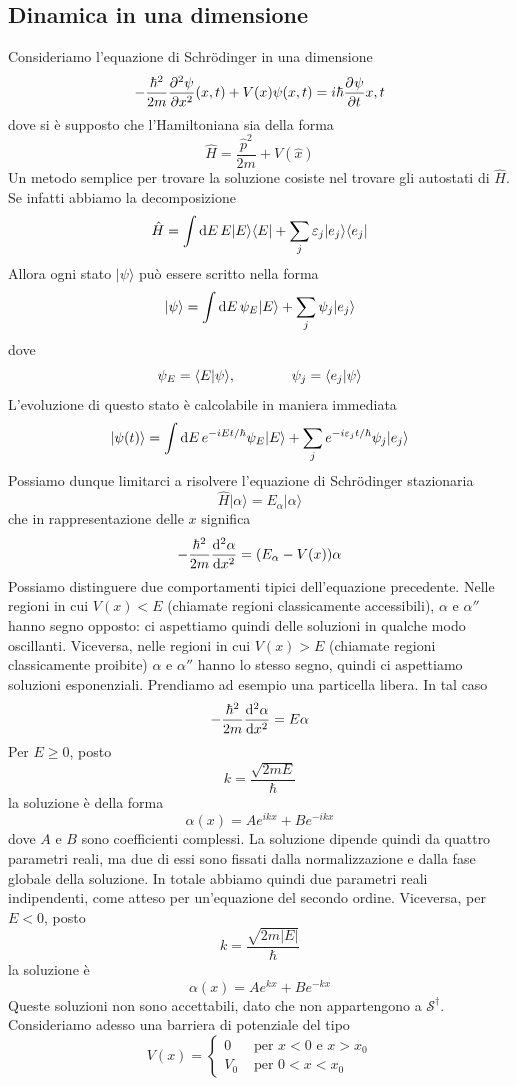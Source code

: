 \documentclass[a4paper, 11pt]{article}
\newcommand{\imp}{\hat{p}}
\newcommand{\ham}{\hat{H}}
\renewcommand{\ket}[1]{| #1\rangle}
\renewcommand{\bra}[1]{\langle #1|}
\begin{document}
\subsection{Dinamica in una dimensione}
Consideriamo l'equazione di Schr\"odinger in una dimensione
\[-\frac{\hbar^2}{2m}\pder[2]{\psi}{x}(x,t)+V(x)\psi(x,t)=i\hbar\pder{\psi}{t}{x,t}\]
dove si è supposto che l'Hamiltoniana sia della forma
\[\ham=\frac{\imp^2}{2m}+V(\hat{x})\]
Un metodo semplice per trovare la soluzione cosiste nel trovare gli autostati di $\ham$. Se infatti abbiamo la decomposizione
\[\ham=\int \d E\, E\ket E\bra E+\sum_{j}\varepsilon_j\ket{e_j}\bra {e_j}\]
Allora ogni stato $\ket\psi$ può essere scritto nella forma
\[\ket{\psi}=\int\d E\,\psi_E\ket E+\sum_{j}\psi_j\ket{e_j}\]
dove
\[\psi_E=\braket{E}{\psi},\qquad\qquad\psi_j=\braket{e_j}{\psi}\]
L'evoluzione di questo stato è calcolabile in maniera immediata
\[\ket{\psi(t)}=\int \d E\,e^{-iEt/\hbar}\psi_E\ket{E}+\sum_{j}e^{-i\varepsilon_jt/\hbar}\psi_j\ket{e_j}\]
Possiamo dunque limitarci a risolvere l'equazione di Schr\"odinger stazionaria
\[\ham\ket{\alpha}=E_\alpha\ket{\alpha}\]
che in rappresentazione delle $x$ significa
\[-\frac{\hbar^2}{2m}\der[2]{\alpha}{x}=(E_\alpha-V(x))\alpha\]
Possiamo distinguere due comportamenti tipici dell'equazione precedente. Nelle regioni in cui $V(x)<E$ (chiamate regioni classicamente accessibili), $\alpha$ e $\alpha''$ hanno segno opposto: ci aspettiamo quindi delle soluzioni in qualche modo oscillanti. Viceversa, nelle regioni in cui $V(x)>E$ (chiamate regioni classicamente proibite) $\alpha$ e $\alpha''$ hanno lo stesso segno, quindi ci aspettiamo soluzioni esponenziali. Prendiamo ad esempio una particella libera. In tal caso
\[-\frac{\hbar^2}{2m}\der[2]{\alpha}{x}=E\alpha\]
Per $E\geq0$, posto
\[k=\frac{\sqrt{2mE}}{\hbar}\]
la soluzione è della forma
\[\alpha(x)=Ae^{ikx}+Be^{-ikx}\]
dove $A$ e $B$ sono coefficienti complessi. La soluzione dipende quindi da quattro parametri reali, ma due di essi sono fissati dalla normalizzazione e dalla fase globale della soluzione. In totale abbiamo quindi due parametri reali indipendenti, come atteso per un'equazione del secondo ordine. Viceversa, per $E<0$, posto
\[k=\frac{\sqrt{2m|E|}}{\hbar}\]
la soluzione è
\[\alpha(x)=Ae^{kx}+Be^{-kx}\]
Queste soluzioni non sono accettabili, dato che non appartengono a $\mathcal{S}^\dagger$. Consideriamo adesso una barriera di potenziale del tipo
\[V(x)=\begin{cases}
0&\textrm{ per }x<0\textrm{ e }x>x_0\\
V_0&\textrm{ per }0<x<x_0
\end{cases}\]
\end{document}

